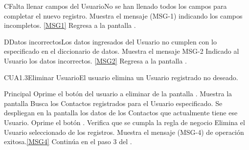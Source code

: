 		\begin{UCtrayectoriaA}{C}{Falta llenar campos del Usuario}{No se han llenado todos los campos para completar el nuevo registro.}
			\UCpaso Muestra el mensaje (MSG-1) indicando los campos incompletos. \ref{MSG1}
			\UCpaso Regresa a la pantalla .
		\end{UCtrayectoriaA}

		 \begin{UCtrayectoriaA}{D}{Datos incorrectos}{Los datos ingresados del Usuario no cumplen con lo especificado en el diccionario de datos.}
			\UCpaso Muestra el mensaje MSG-2 Indicado al Usuario los datos incorrectos. \ref{MSG2}
			\UCpaso Regresa a la pantalla .
		\end{UCtrayectoriaA}


	\begin{UseCase}{CUA1.3}{Eliminar Usuario}{El usuario elimina un Usuario registrado no deseado.}
	\end{UseCase}

	\begin{UCtrayectoria}{Principal}
			\UCpaso[\UCactor] Oprime el botón  del usuario a eliminar de la pantalla .
			\UCpaso Muestra la pantalla 
			\UCpaso Busca los Contactos registrados para el Usuario especificado.\label{paso:CU2BuscarContactos}
			\UCpaso Se despliegan en la pantalla los datos de los Contactos que actualmente tiene ese Usuario.
			\UCpaso [\UCactor] Oprime el botón .
			\UCpaso Verifica que se cumpla la regla de negocio  
			\UCpaso Elimina el Usuario seleccionado de los registros.
			\UCpaso Muestra el mensaje (MSG-4) de operación exitosa.\ref{MSG4}
			\UCpaso Continúa en el paso 3 del .
	\end{UCtrayectoria}

